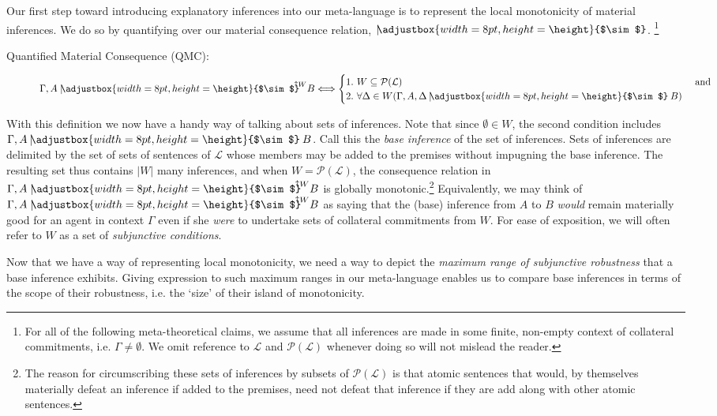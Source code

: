 \documentclass{article}
\newcommand{\ssim}{%
     \setbox0=\hbox{$\sim$}%
     \adjustbox{width=8pt,height=\height}{$\sim$}
}
\newcommand{\uuparrow}{%
     \setbox0=\hbox{$\scriptstyle\uparrow$}%
     \raisebox{.2ex}{$\scriptstyle\uparrow$}
}
\newcommand{\nmc}{\mathbin{\mid\joinrel\!\!\ssim}}
\newcommand{\qmc}[4][\Gamma,]{{#1#2\mathrel{\nmc}}^{\!\!\!\!\uuparrow\scriptstyle #4}#3}
\begin{document}
Our first step toward introducing explanatory inferences into our meta-language is to represent the local monotonicity of material inferences. We do so by quantifying over our material consequence relation, $ \nmc $. \footnote{For all of the following meta-theoretical claims, we assume that all inferences are made in some finite, non-empty context of collateral commitments, i.e. $ \Gamma \neq \emptyset $. We omit reference to $\mathcal{L}$ and $\mathcal{P}(\mathcal{L})$ whenever doing so will not mislead the reader.}
	\begin{description}
		\item[Quantified Material Consequence (QMC):]
		\begin{equation}
              \qmc{A}{B}{W} \Longleftrightarrow
				      \begin{cases}\nonumber
				        1.\,\, W\subseteq\mathcal{P}(\mathcal{L}) & $ and $ \\
						2.\,\, \forall\Delta\in W(\Gamma, A,  \Delta \nmc B ) 
						\end{cases}
		\end{equation}
		
	\end{description}  
	
With this definition we now have a handy way of talking about sets of inferences. Note that since $ \emptyset \in W $, the second condition includes $ \Gamma, A \nmc B $. Call this the \textit{base inference} of the set of inferences. Sets of inferences are delimited by the set of sets of sentences of $ \mathcal{L} $ whose members may be added to the premises without impugning the base inference. The resulting set thus contains $ |W| $ many inferences,  and when $ W = \mathcal{P}(\mathcal{L}) $, the consequence relation in $\qmc{A}{B}{W} $ is globally monotonic.\footnote{The reason for circumscribing these sets of inferences by subsets of $ \mathcal{P}(\mathcal{L}) $ is that atomic sentences that would, by themselves materially defeat an inference if added to the premises, need not defeat that inference if they are add along with other atomic sentences.} Equivalently, we may think of $ \qmc{A}{B}{W}  $ as saying that the (base) inference from $ A $ to $ B $ \textit{would} remain materially good for an agent in context $ \Gamma $ even if she \textit{were} to undertake sets of collateral commitments from $ W $. For ease of exposition, we will often refer to $W$ as a set of \textit{subjunctive conditions}.

Now that we have a way of representing local monotonicity, we need a way to depict the \textit{maximum range of subjunctive robustness} that a base inference exhibits. Giving expression to such maximum ranges in our meta-language enables us to compare base inferences in terms of the scope of their robustness, i.e. the `size' of their island of monotonicity.
\end{document}
